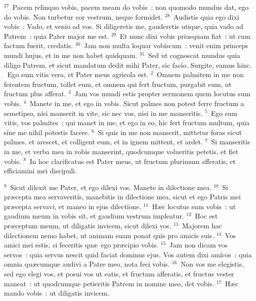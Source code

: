 ${}^{27}$~Pacem relinquo vobis, pacem meam do vobis~: non quomodo mundus dat, ego do vobis. Non turbetur cor vestrum, neque formidet.
${}^{28}$~Audistis quia ego dixi vobis~: Vado, et venio ad vos. Si diligeretis me, gauderetis utique, quia vado ad Patrem~: quia Pater major me est.
${}^{29}$~Et nunc dixi vobis priusquam fiat~: ut cum factum fuerit, credatis.
${}^{30}$~Jam non multa loquar vobiscum~: venit enim princeps mundi hujus, et in me non habet quidquam.
${}^{31}$~Sed ut cognoscat mundus quia diligo Patrem, et sicut mandatum dedit mihi Pater, sic facio. Surgite, eamus hinc.
~\lettrine[lines=10,image=true,loversize=0.05,lraise=-0.03]{E}{}go sum vitis vera, et Pater meus agricola est.
${}^{2}$~Omnem palmitem in me non ferentem fructum, tollet eum, et omnem qui fert fructum, purgabit eum, ut fructum plus afferat.
${}^{3}$~Jam vos mundi estis propter sermonem quem locutus sum vobis.
${}^{4}$~Manete in me, et ego in vobis. Sicut palmes non potest ferre fructum a semetipso, nisi manserit in vite, sic nec vos, nisi in me manseritis.
${}^{5}$~Ego sum vitis, vos palmites~: qui manet in me, et ego in eo, hic fert fructum multum, quia sine me nihil potestis facere.
${}^{6}$~Si quis in me non manserit, mittetur foras sicut palmes, et arescet, et colligent eum, et in ignem mittent, et ardet.
${}^{7}$~Si manseritis in me, et verba mea in vobis manserint, quodcumque volueritis petetis, et fiet vobis.
${}^{8}$~In hoc clarificatus est Pater meus, ut fructum plurimum afferatis, et efficiamini mei discipuli.


${}^{9}$~Sicut dilexit me Pater, et ego dilexi vos. Manete in dilectione mea.
${}^{10}$~Si pr\ae cepta mea servaveritis, manebitis in dilectione mea, sicut et ego Patris mei pr\ae cepta servavi, et maneo in ejus dilectione.
${}^{11}$~H\ae c locutus sum vobis~: ut gaudium meum in vobis sit, et gaudium vestrum impleatur.
${}^{12}$~Hoc est pr\ae ceptum meum, ut diligatis invicem, sicut dilexi vos.
${}^{13}$~Majorem hac dilectionem nemo habet, ut animam suam ponat quis pro amicis suis.
${}^{14}$~Vos amici mei estis, si feceritis qu\ae\ ego pr\ae cipio vobis.
${}^{15}$~Jam non dicam vos servos~: quia servus nescit quid faciat dominus ejus. Vos autem dixi amicos~: quia omnia qu\ae cumque audivi a Patre meo, nota feci vobis.
${}^{16}$~Non vos me elegistis, sed ego elegi vos, et posui vos ut eatis, et fructum afferatis, et fructus vester maneat~: ut quodcumque petieritis Patrem in nomine meo, det vobis.
${}^{17}$~H\ae c mando vobis~: ut diligatis invicem.


